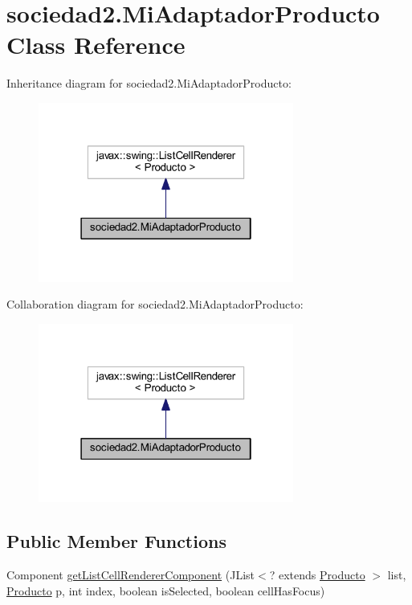 \hypertarget{classsociedad2_1_1_mi_adaptador_producto}{}\section{sociedad2.\+Mi\+Adaptador\+Producto Class Reference}
\label{classsociedad2_1_1_mi_adaptador_producto}


Inheritance diagram for sociedad2.\+Mi\+Adaptador\+Producto\+:
\nopagebreak
\begin{figure}[H]
\begin{center}
\leavevmode
\includegraphics[width=238pt]{classsociedad2_1_1_mi_adaptador_producto__inherit__graph}
\end{center}
\end{figure}


Collaboration diagram for sociedad2.\+Mi\+Adaptador\+Producto\+:
\nopagebreak
\begin{figure}[H]
\begin{center}
\leavevmode
\includegraphics[width=238pt]{classsociedad2_1_1_mi_adaptador_producto__coll__graph}
\end{center}
\end{figure}
\subsection*{Public Member Functions}
\begin{DoxyCompactItemize}
\item 
Component \mbox{\hyperlink{classsociedad2_1_1_mi_adaptador_producto_af202727879511339e4a8916d8e7f3be5}{get\+List\+Cell\+Renderer\+Component}} (J\+List$<$? extends \mbox{\hyperlink{classsociedad2_1_1_producto}{Producto}} $>$ list, \mbox{\hyperlink{classsociedad2_1_1_producto}{Producto}} p, int index, boolean is\+Selected, boolean cell\+Has\+Focus)
\end{DoxyCompactItemize}



